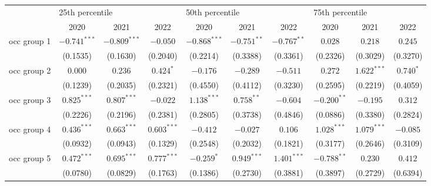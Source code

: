 \begin{tabular}{l|ccc|ccc|ccc|}
\toprule
{} & \multicolumn{3}{l}{25th percentile} & \multicolumn{3}{l}{50th percentile} & \multicolumn{3}{l}{75th percentile} \\
{} &            2020 &            2021 &            2022 &            2020 &            2021 &            2022 &            2020 &            2021 &            2022 \\
\midrule
occ group 1          &  $-0.741^{***}$ &  $-0.809^{***}$ &        $-0.050$ &  $-0.868^{***}$ &   $-0.751^{**}$ &   $-0.767^{**}$ &         $0.028$ &         $0.218$ &         $0.245$ \\
                     &        (0.1535) &        (0.1630) &        (0.2040) &        (0.2214) &        (0.3388) &        (0.3361) &        (0.2326) &        (0.3029) &        (0.3270) \\
occ group 2          &         $0.000$ &         $0.236$ &       $0.424^*$ &        $-0.176$ &        $-0.289$ &        $-0.511$ &         $0.272$ &   $1.622^{***}$ &       $0.740^*$ \\
                     &        (0.1239) &        (0.2035) &        (0.2321) &        (0.4550) &        (0.4112) &        (0.3230) &        (0.2595) &        (0.2219) &        (0.4059) \\
occ group 3          &   $0.825^{***}$ &   $0.807^{***}$ &        $-0.022$ &   $1.138^{***}$ &    $0.758^{**}$ &        $-0.604$ &   $-0.200^{**}$ &        $-0.195$ &         $0.312$ \\
                     &        (0.2226) &        (0.2196) &        (0.2381) &        (0.2805) &        (0.3738) &        (0.4846) &        (0.0886) &        (0.3380) &        (0.2824) \\
occ group 4          &   $0.436^{***}$ &   $0.663^{***}$ &   $0.603^{***}$ &        $-0.412$ &        $-0.027$ &         $0.106$ &   $1.028^{***}$ &   $1.079^{***}$ &        $-0.085$ \\
                     &        (0.0932) &        (0.0943) &        (0.1329) &        (0.2548) &        (0.2032) &        (0.1821) &        (0.3177) &        (0.2646) &        (0.3109) \\
occ group 5          &   $0.472^{***}$ &   $0.695^{***}$ &   $0.777^{***}$ &      $-0.259^*$ &   $0.949^{***}$ &   $1.401^{***}$ &   $-0.788^{**}$ &         $0.230$ &         $0.412$ \\
                     &        (0.0780) &        (0.0829) &        (0.1763) &        (0.1386) &        (0.2730) &        (0.3881) &        (0.3897) &        (0.2729) &        (0.6394) \\

\end{tabular}
